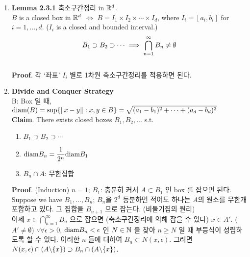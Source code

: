 \begin{enumerate}
	\item \textbf{Lemma 2.3.1} 축소구간정리 in $\mathbb{R}^d$.\\
	$B$ is a closed box in $\mathbb{R}^d$ $\iff$ $B = I_1\times I_2 \times \cdots \times I_d$, where $I_i = [a_i, b_i]$ for $i = 1, \dots, d$. ($I_i$ is a closed and bounded interval.)\\
	$$B_1\supset B_2\supset \cdots \implies \bigcap_{n=1}^\infty B_n \neq \emptyset$$\\
	\textbf{Proof}. 각 `좌표' $I_i$ 별로 1차원 축소구간정리를 적용하면 된다.
	\item \textbf{Divide and Conquer Strategy}\\
	B: Box 일 때, $\text{diam}(B) = \sup\{\left\lVert x-y\right\rVert: x, y\in B \} = \sqrt{(a_1-b_1)^2 + \cdots + (a_d-b_d)^2}$\\
	\textbf{Claim}. There exists closed boxes $B_1, B_2, \dots$ s.t. 
	\begin{enumerate}
		\item $B_1\supset B_2\supset \cdots$
		\item $\text{diam} B_n = \dfrac{1}{2^n}\text{diam} B_1$
		\item $B_n\cap A$: 무한집합
	\end{enumerate}
	\textbf{Proof}. (Induction) $n = 1$; $B_1$: 충분히 커서 $A\subset B_1$ 인 box 를 잡으면 된다.\\
	Suppose we have $B_1, \dots, B_n$; $B_n$을 $2^d$ 등분하면 적어도 하나는 $A$의 원소를 무한개 포함하고 있다. 그 집합을 $B_{n+1}$ 으로 잡는다. (비둘기집의 원리)\\
	이제 $x\in \bigcap_{n=1}^\infty B_n$ 으로 잡으면 (축소구간정리에 의해 잡을 수 있다) $x\in A'$. ($A'\neq \emptyset$)
	$\because \forall \epsilon>0$, $\text{diam} B_n <\epsilon$ 인 $N\in \mathbb{N}$ 을 찾아 $n\geq N$ 일 때 부등식이 성립하도록 할 수 있다. 이러한 $n$ 들에 대하여 $B_n\subset N(x, \epsilon)$. 그러면 $N(x, \epsilon)\cap (A\backslash \{x\}) \supset B_n\cap (A\backslash \{x\})$.
\end{enumerate}
\pagebreak